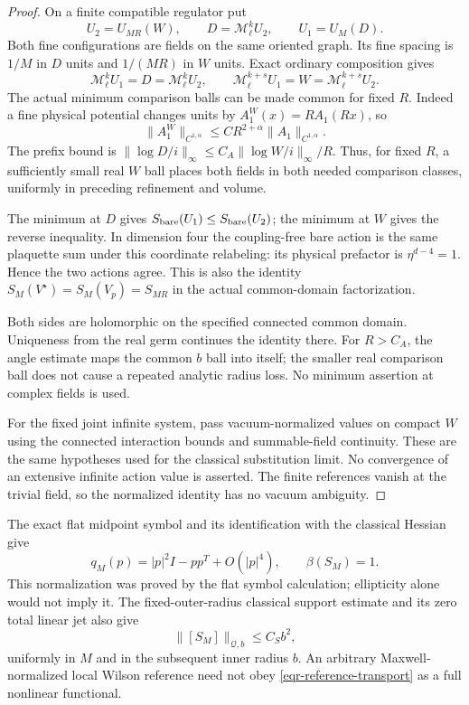 \documentclass[11pt]{article}
\theoremstyle{remark}
\begin{document}
\begin{proof}
On a finite compatible regulator put
\[
 U_2=U_{MR}(W),\qquad D=\mathcal M_\ell^kU_2,\qquad U_1=U_M(D).
\]
Both fine configurations are fields on the same oriented graph.
Its fine spacing is $1/M$ in $D$ units and $1/(MR)$ in $W$ units.
Exact ordinary composition gives
\begin{equation}
 \mathcal M_\ell^kU_1=D=\mathcal M_\ell^kU_2,\qquad
 \mathcal M_\ell^{k+s}U_1=W=\mathcal M_\ell^{k+s}U_2.
 \label{eqr-two-constraints}
\end{equation}
The actual minimum comparison balls can be made common for fixed $R$.
Indeed a fine physical potential changes units by
$A_1^W(x)=R A_1(Rx)$, so
\begin{equation}
 \|A_1^W\|_{C^{1,\alpha}}
       \le CR^{2+\alpha}\|A_1\|_{C^{1,\alpha}}.
 \label{eqr-reference-rescaling}
\end{equation}
The prefix bound is
$\|\log D/i\|_\infty\le C_A\|\log W/i\|_\infty/R$.
Thus, for fixed $R$, a sufficiently small real $W$ ball places
both fields in both needed comparison classes, uniformly in
preceding refinement and volume.

The minimum at $D$ gives $S_{\rm bare}(U_1)\le S_{\rm bare}(U_2)$;
the minimum at $W$ gives the reverse inequality. In dimension four
the coupling-free bare action is the same plaquette sum under this
coordinate relabeling: its physical prefactor is
$\eta^{d-4}=1$. Hence the two actions agree. This is also the identity
$S_M(V^\star)=S_M(V_p)=S_{MR}$ in the actual common-domain
factorization.

Both sides are holomorphic on the specified connected common domain.
Uniqueness from the real germ continues the identity there.
For $R>C_A$, the angle estimate maps the common $b$ ball into itself;
the smaller real comparison ball does not cause a repeated analytic
radius loss. No minimum assertion at complex fields is used.

For the fixed joint infinite system, pass vacuum-normalized values on
compact $W$ using the connected interaction bounds and summable-field
continuity. These are the same hypotheses used for the classical
substitution limit. No convergence of an extensive infinite action
value is asserted. The finite references vanish at the trivial field,
so the normalized identity has no vacuum ambiguity.
\end{proof}

The exact flat midpoint symbol and its identification with the
classical Hessian give
\begin{equation}
 q_M(p)=|p|^2I-pp^T+O(|p|^4),\qquad \beta(S_M)=1.
 \label{eqr-reference-beta}
\end{equation}
This normalization was proved by the flat symbol calculation;
ellipticity alone would not imply it. The fixed-outer-radius
classical support estimate and its zero total linear jet also give
\begin{equation}
                    \|[S_M]\|_{\mathcal Q,b}\le C_Sb^2,
 \label{eqr-reference-size}
\end{equation}
uniformly in $M$ and in the subsequent inner radius $b$.
An arbitrary Maxwell-normalized local Wilson reference need not obey
\eqref{eqr-reference-transport} as a full nonlinear functional.
\end{document}
